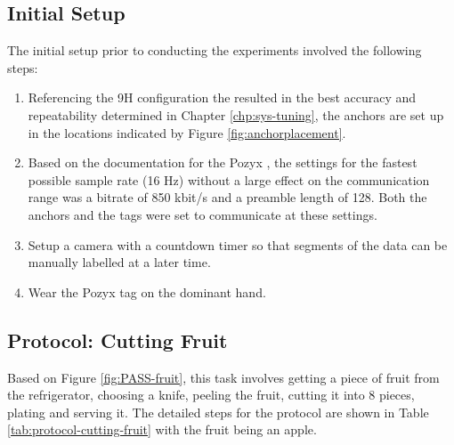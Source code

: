 \subsection{Initial Setup}
The initial setup prior to conducting the experiments involved the following steps:

\begin{enumerate}
    \item Referencing the 9H configuration the resulted in the best accuracy and repeatability determined in Chapter \ref{chp:sys-tuning}, the anchors are set up in the locations indicated by Figure \ref{fig:anchorplacement}.
    \item Based on the documentation for the Pozyx \cite{pozyx_configuration_nodate}, the settings for the fastest possible sample rate (16 Hz) without a large effect on the communication range was a bitrate of 850 kbit/s and a preamble length of 128. Both the anchors and the tags were set to communicate at these settings.
    \item Setup a camera with a countdown timer so that segments of the data can be manually labelled at a later time.
    \item Wear the Pozyx tag on the dominant hand.
\end{enumerate}

\subsection{Protocol: Cutting Fruit}
Based on Figure \ref{fig:PASS-fruit}, this task involves getting a piece of fruit from the refrigerator, choosing a knife, peeling the fruit, cutting it into 8 pieces, plating and serving it. The detailed steps for the protocol are shown in Table \ref{tab:protocol-cutting-fruit} with the fruit being an apple.

